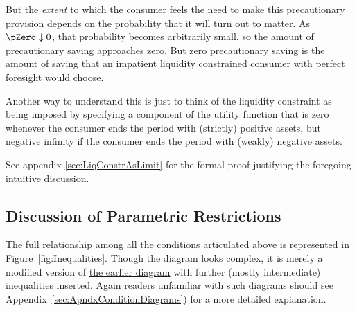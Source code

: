 \documentclass[BufferStockTheory]{subfiles}
\begin{document}
But the \textit{extent} to which the consumer feels the need to make this
precautionary provision depends on the probability that it will turn
out to matter.  As $\pZero \downarrow 0$, that probability becomes
arbitrarily small, so the amount of precautionary saving approaches zero.
But zero precautionary saving is the amount of saving that an impatient liquidity
constrained consumer with perfect foresight would choose.

Another way to understand this is just to think of the liquidity
constraint as being imposed by specifying a component of the utility
function that is zero whenever the consumer ends the period with
(strictly) positive assets, but negative infinity if the consumer
ends the period with (weakly) negative assets.

See appendix \ref{sec:LiqConstrAsLimit} for the formal proof justifying the
foregoing intuitive discussion.


\hypertarget{Discussion-of-Parametric-Restrictions}{}
\subsection{Discussion of Parametric Restrictions}\label{sec:discussConvergence}

The full relationship among all the conditions articulated above is represented in Figure~\ref{fig:Inequalities}.
Though the diagram looks complex, it is merely a modified version of \href{fig:RelatePFGICFHWCRICPFFVAC}{the earlier diagram} with further (mostly intermediate) inequalities inserted.  Again readers unfamiliar with such diagrams should see Appendix~\ref{sec:ApndxConditionDiagrams}) for a more detailed explanation.

\renewcommand{\figName}{Inequalities} %
\renewcommand{\figFile}{\figName} %
\hypertarget{\figFile}{}
\hypertarget{\figName}{}
\end{document}
